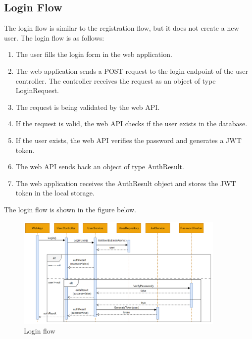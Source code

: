 \subsection{Login Flow}
The login flow is similar to the registration flow, but it does not create a new user.
The login flow is as follows:
\begin{enumerate}
    \item The user fills the login form in the web application.
    \item The web application sends a POST request to the login endpoint of the user controller. The controller
    receives the request as an object of type LoginRequest.
    \item The request is being validated by the web API.
    \item If the request is valid, the web API checks if the user exists in the database.
    \item If the user exists, the web API verifies the password and generates a JWT token.
    \item The web API sends back an object of type AuthResult.
    \item The web application receives the AuthResult object and stores the JWT token in the local storage.
\end{enumerate}

The login flow is shown in the figure below.
\begin{figure}[H]
    \centering
    \includegraphics[width=0.9\textwidth]{images/login-flow.png}
    \caption{Login flow}
    \label{fig:login-flow}
\end{figure}